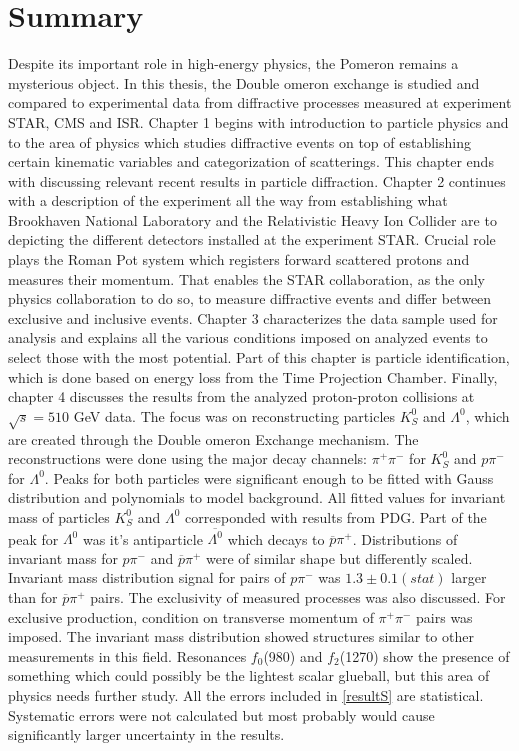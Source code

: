 \chapter*{Summary}
Despite its important role in high-energy physics, the Pomeron remains a mysterious object. In this thesis, the Double \Pom omeron exchange is studied and compared to experimental data from diffractive processes measured at experiment STAR, CMS and ISR.
\newline
Chapter 1 begins with introduction to particle physics and to the area of physics which studies diffractive events on top of establishing certain kinematic variables and categorization of scatterings. This chapter ends with discussing relevant recent results in particle diffraction. Chapter 2 continues with a description of the experiment all the way from establishing what Brookhaven National Laboratory and the Relativistic Heavy Ion Collider are to depicting the different detectors installed at the experiment STAR. Crucial role plays the Roman Pot system which registers forward scattered protons and measures their momentum. That enables the STAR collaboration, as the only physics collaboration to do so, to measure diffractive events and differ between exclusive and inclusive events. Chapter 3 characterizes the data sample used for analysis and explains all the various conditions imposed on analyzed events to select those with the most potential. Part of this chapter is particle identification, which is done based on energy loss from the Time Projection Chamber. 
\newline
Finally, chapter 4 discusses the results from the analyzed proton-proton collisions at $\sqrt{s}=510$ GeV data. The focus was on reconstructing particles $K^0_S$ and $\Lambda^0$, which are created through the Double \Pom omeron Exchange mechanism. The reconstructions were done using the major decay channels: $\pi^+ \pi^-$ for $K^0_S$ and $p \pi^-$ for $\Lambda^0$. Peaks for both particles were significant enough to be fitted with Gauss distribution and polynomials to model background. All fitted values for invariant mass of particles $K^0_S$ and $\Lambda^0$ corresponded with results from PDG. Part of the peak for $\Lambda^0$ was it's antiparticle $\overline{\Lambda^0}$ which decays to $\overline{p} \pi^+$. Distributions of invariant mass for $p \pi^-$ and $\overline{p} \pi^+$ were of similar shape but differently scaled. Invariant mass distribution signal for pairs of $p \pi^-$ was $1.3 \pm 0.1(stat)$ larger than for $\overline{p} \pi^+$ pairs. The exclusivity of measured processes was also discussed. For exclusive production, condition on transverse momentum of $\pi^+ \pi^-$ pairs was imposed. The invariant mass distribution showed structures similar to other measurements in this field. Resonances $f_0$(980) and $f_2$(1270) show the presence of something which could possibly be the lightest scalar glueball, but this area of physics needs further study. All the errors included in \autoref{resultS} are statistical. Systematic errors were not calculated but most probably would cause significantly larger uncertainty in the results. 
